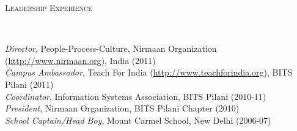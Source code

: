 \documentclass[11pt]{article}
\newenvironment{changemargin}[2]{%
  \begin{list}{}{%
    \setlength{\topsep}{0pt}%
    \setlength{\leftmargin}{#1}%
    \setlength{\rightmargin}{#2}%
    \setlength{\listparindent}{\parindent}%
    \setlength{\itemindent}{\parindent}%
    \setlength{\parsep}{\parskip}%
  }%
  \item[]}{\end{list}
}
\newcommand{\lineover}{
	\begin{changemargin}{-0.05in}{-0.05in}
		\vspace*{-8pt}
		\hrulefill \\
		\vspace*{-2pt}
	\end{changemargin}
}
\newcommand{\header}[1]{
	\begin{changemargin}{-0.5in}{-0.5in}
		\scshape{#1}\\
  	\lineover
	\end{changemargin}
}
\newenvironment{body} {
	\vspace*{-16pt}
	\begin{changemargin}{-0.25in}{-0.5in}
  }	
	{\end{changemargin}
}
\begin{document}
\smallskip


\header{Leadership Experience}

\begin{body}
	\vspace{14pt}
	\emph{Director}, People-Process-Culture, Nirmaan Organization (\url{http://www.nirmaan.org}), India (2011) \\
	\emph{Campus Ambassador}, Teach For India (\url{http://www.teachforindia.org}), BITS Pilani (2011) \\
	\emph{Coordinator}, Information Systems Association, BITS Pilani (2010-11) \\
	\emph{President}, Nirmaan Organization, BITS Pilani Chapter (2010) \\
	\emph{School Captain/Head Boy}, Mount Carmel School, New Delhi (2006-07) \\
\end{body}
\end{document}
